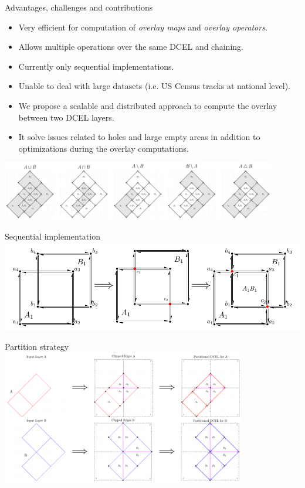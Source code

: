 \documentclass{beamer}
\begin{document}
    \begin{frame}{Advantages, challenges and contributions}
        \begin{itemize}
            \item Very efficient for computation of \textit{overlay maps} and \textit{overlay operators}.
            \item Allows multiple operations over the same DCEL and chaining.
            \item Currently only sequential implementations.
            \item Unable to deal with large datasets (i.e. US Census tracks at national level).
            \item We propose a scalable and distributed approach to compute the overlay between two DCEL layers.
            \item It solve issues related to holes and large empty areas in addition to optimizations during the overlay computations.  
        \end{itemize}
        \vspace{0.25cm}

        \centering
        \includegraphics[width=0.9\textwidth]{figures/dcel_operators}        
    \end{frame}
    
    \begin{frame}{Sequential implementation}
        \centering
        \includegraphics[width=\textwidth]{figures/dcel_seq}
    \end{frame}
    
    \begin{frame}{Partition strategy}
        \centering
        \includegraphics[width=0.8\textwidth]{figures/partition_strategy}
    \end{frame}
\end{document}
